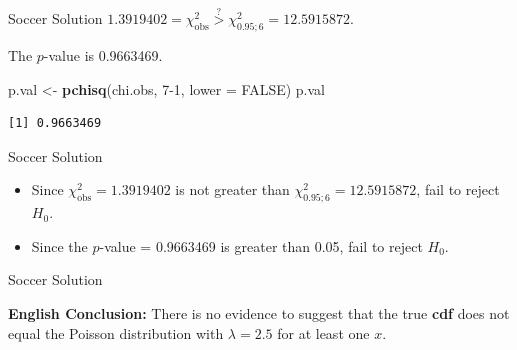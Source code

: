 \documentclass[
  ignorenonframetext,
]{beamer}
\newenvironment{Shaded}{\begin{snugshade}}{\end{snugshade}}
\newcommand{\AttributeTok}[1]{\textcolor[rgb]{0.13,0.29,0.53}{#1}}
\newcommand{\ConstantTok}[1]{\textcolor[rgb]{0.56,0.35,0.01}{#1}}
\newcommand{\DecValTok}[1]{\textcolor[rgb]{0.00,0.00,0.81}{#1}}
\newcommand{\FunctionTok}[1]{\textcolor[rgb]{0.13,0.29,0.53}{\textbf{#1}}}
\newcommand{\NormalTok}[1]{#1}
\newcommand{\OtherTok}[1]{\textcolor[rgb]{0.56,0.35,0.01}{#1}}
\begin{document}
\begin{frame}[fragile]{Soccer Solution}
\protect\hypertarget{soccer-solution-7}{}
\(1.3919402=\chi^2_{\text{obs}}\overset{?}{>}\chi^2_{0.95;6}=12.5915872\).

The \(p\)-value is 0.9663469.

\begin{Shaded}
\begin{Highlighting}[]
\NormalTok{p.val }\OtherTok{\textless{}{-}} \FunctionTok{pchisq}\NormalTok{(chi.obs, }\DecValTok{7{-}1}\NormalTok{, }\AttributeTok{lower =} \ConstantTok{FALSE}\NormalTok{)}
\NormalTok{p.val}
\end{Highlighting}
\end{Shaded}

\begin{verbatim}
[1] 0.9663469
\end{verbatim}
\end{frame}

\begin{frame}{Soccer Solution}
\protect\hypertarget{soccer-solution-8}{}
\begin{itemize}
\item
  Since \(\chi^2_{\text{obs}}= 1.3919402\) is not greater than
  \(\chi^2_{0.95;6}=12.5915872\), fail to reject \(H_0\).
\item
  Since the \(p\)-value = 0.9663469 is greater than 0.05, fail to reject
  \(H_0\).
\end{itemize}
\end{frame}

\begin{frame}{Soccer Solution}
\protect\hypertarget{soccer-solution-9}{}
\begin{tcolorbox}
\textbf{English Conclusion:} There is no evidence to suggest that the true \textbf{cdf} does not equal the Poisson 
distribution with $\lambda=2.5$ for at least one $x$.
\end{tcolorbox}
\end{frame}
\end{document}
